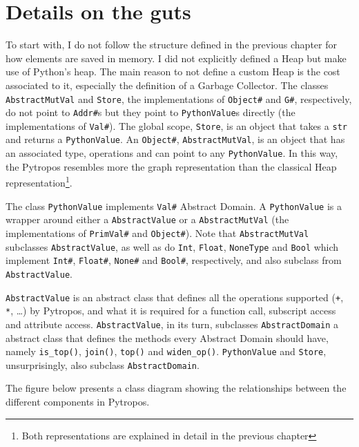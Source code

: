 \documentclass[
11pt, %
english, %
singlespacing, %
headsepline, %
]{MastersDoctoralThesis} %
\begin{document}
\hypertarget{details-on-the-guts}{%
\section{Details on the guts}\label{details-on-the-guts}}

To start with, I do not follow the structure defined in the previous
chapter for how elements are saved in memory. I did not explicitly
defined a Heap but make use of Python's heap. The main reason to not
define a custom Heap is the cost associated to it, especially the
definition of a Garbage Collector. The classes \texttt{AbstractMutVal}
and \texttt{Store}, the implementations of \texttt{Object\#} and
\texttt{G\#}, respectively, do not point to \texttt{Addr\#}s but they
point to \texttt{PythonValue}s directly (the implementations of
\texttt{Val\#}). The global scope, \texttt{Store}, is an object that
takes a \texttt{str} and returns a \texttt{PythonValue}. An
\texttt{Object\#}, \texttt{AbstractMutVal}, is an object that has an
associated type, operations and can point to any \texttt{PythonValue}.
In this way, the Pytropos resembles more the graph representation than
the classical Heap representation\footnote{Both representations are
  explained in detail in the previous chapter}.

The class \texttt{PythonValue} implements \texttt{Val\#} Abstract
Domain. A \texttt{PythonValue} is a wrapper around either a
\texttt{AbstractValue} or a \texttt{AbstractMutVal} (the implementations
of \texttt{PrimVal\#} and \texttt{Object\#}). Note that
\texttt{AbstractMutVal} subclasses \texttt{AbstractValue}, as well as do
\texttt{Int}, \texttt{Float}, \texttt{NoneType} and \texttt{Bool} which
implement \texttt{Int\#}, \texttt{Float\#}, \texttt{None\#} and
\texttt{Bool\#}, respectively, and also subclass from
\texttt{AbstractValue}.

\texttt{AbstractValue} is an abstract class that defines all the
operations supported (\texttt{+}, \texttt{*}, \ldots{}) by Pytropos, and
what it is required for a function call, subscript access and attribute
access. \texttt{AbstractValue}, in its turn, subclasses
\texttt{AbstractDomain} a abstract class that defines the methods every
Abstract Domain should have, namely \texttt{is\_top()}, \texttt{join()},
\texttt{top()} and \texttt{widen\_op()}. \texttt{PythonValue} and
\texttt{Store}, unsurprisingly, also subclass \texttt{AbstractDomain}.

The figure below presents a class diagram showing the relationships
between the different components in Pytropos.
\end{document}
